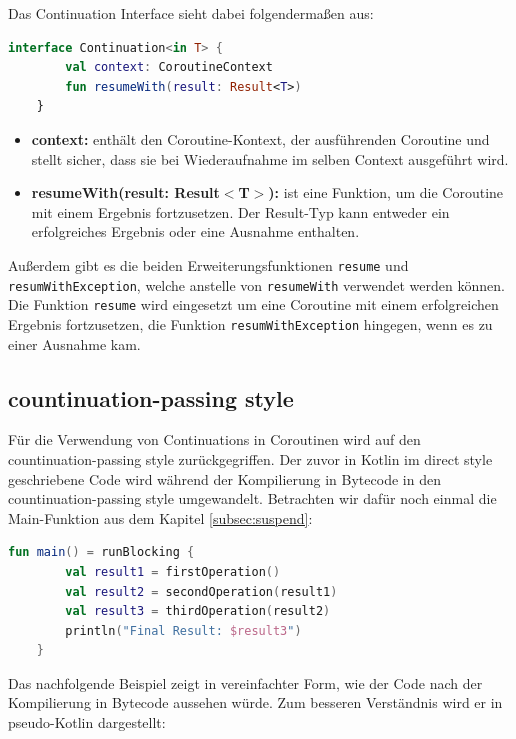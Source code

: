\documentclass[fontsize=12pt,paper=a4,twoside=semi,parskip=half-,headsepline,headinclude]{scrreprt}
\begin{document}
Das Continuation Interface sieht dabei folgendermaßen aus:

\begin{lstlisting}[language=Kotlin]
	interface Continuation<in T> {
		val context: CoroutineContext
		fun resumeWith(result: Result<T>)
	}
\end{lstlisting}

\begin{itemize}
	\item \textbf{context:} enthält den Coroutine-Kontext, der ausführenden Coroutine und stellt sicher, dass sie bei Wiederaufnahme im selben Context ausgeführt wird.
	\item \textbf{resumeWith(result: Result$<$T$>$):} ist eine Funktion, um die Coroutine mit einem Ergebnis fortzusetzen. Der Result-Typ kann entweder ein erfolgreiches Ergebnis oder eine Ausnahme enthalten.
\end{itemize}

Außerdem gibt es die beiden Erweiterungsfunktionen \texttt{resume} und \texttt{resumWithException}, welche anstelle von \texttt{resumeWith} verwendet werden können. Die Funktion \texttt{resume} wird eingesetzt um eine Coroutine mit einem erfolgreichen Ergebnis fortzusetzen, die Funktion \texttt{resumWithException} hingegen, wenn es zu einer Ausnahme kam.


\subsection{countinuation-passing style}
\label{subsec:csp}

Für die Verwendung von Continuations in Coroutinen wird auf den countinuation-passing style\cite{sus75} zurückgegriffen. Der zuvor in Kotlin im direct style geschriebene Code wird während der Kompilierung in Bytecode in den countinuation-passing style umgewandelt\cite{Elizarov2017b}. Betrachten wir dafür noch einmal die Main-Funktion aus dem Kapitel \ref{subsec:suspend}:

\begin{lstlisting}[language=Kotlin]
	fun main() = runBlocking {
		val result1 = firstOperation()
		val result2 = secondOperation(result1)
		val result3 = thirdOperation(result2)
		println("Final Result: $result3")
	}
\end{lstlisting}

 Das nachfolgende Beispiel zeigt in vereinfachter Form, wie der Code nach der Kompilierung in Bytecode aussehen würde. Zum besseren Verständnis wird er in pseudo-Kotlin dargestellt:
\end{document}
